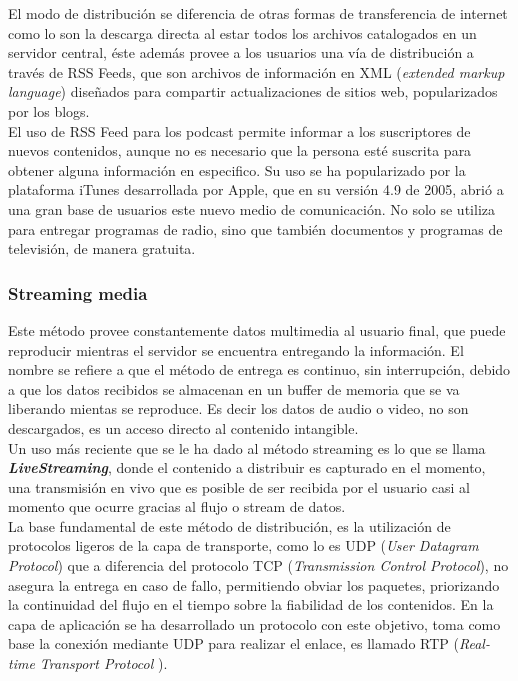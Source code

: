 El modo de distribución se diferencia de otras formas de transferencia de internet como lo son la descarga directa al estar todos los archivos catalogados en un servidor central, éste además provee a los usuarios una vía de distribución a través de RSS Feeds, que son archivos de información en XML (\textit{extended markup language}) diseñados para compartir actualizaciones de sitios web, popularizados por los blogs.\\ 
El uso de RSS Feed para los podcast permite informar a los suscriptores de nuevos contenidos, aunque no es necesario que la persona esté suscrita para obtener alguna información en especifico. 
Su uso se ha popularizado por la plataforma iTunes desarrollada por Apple, que en su versión 4.9 de 2005, abrió a una gran base de usuarios este nuevo medio de comunicación. No solo se utiliza para entregar programas de radio, sino que también documentos y programas de televisión, de manera gratuita.\\

\subsubsection{Streaming media}
Este método provee constantemente datos multimedia al usuario final, que puede reproducir mientras el servidor se encuentra entregando la información.
El nombre se refiere a que el método de entrega es continuo, sin interrupción, debido a que los datos recibidos se almacenan en un buffer de memoria que se va liberando mientas se reproduce. Es decir los datos de audio o video, no son descargados,  es un acceso directo al contenido intangible.\\

Un uso más reciente que se le ha dado al método streaming es lo que se llama \textbf{\textit{LiveStreaming}}, donde el contenido a distribuir es capturado en el momento, una transmisión en vivo que es posible de ser recibida por el usuario casi al momento que ocurre gracias al flujo o stream de datos.\\

La base fundamental de este método de distribución, es la utilización de protocolos ligeros de la capa de transporte, como lo es UDP (\textit{User Datagram Protocol}) que a diferencia del protocolo TCP (\textit{Transmission Control Protocol}), no asegura la entrega en caso de fallo, permitiendo obviar los paquetes, priorizando la continuidad del flujo en el tiempo sobre la fiabilidad de los contenidos.  En la capa de aplicación se ha desarrollado un protocolo con este objetivo, toma como base la conexión mediante UDP para realizar el enlace, es llamado RTP (\textit{Real-time Transport Protocol} \cite{sota:rtp-draft}).\\

